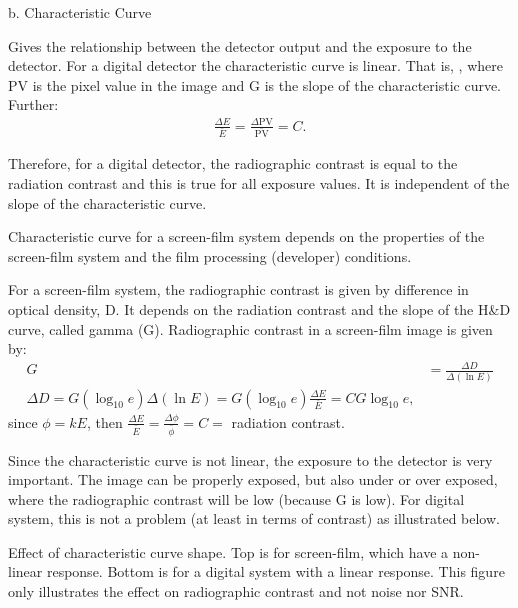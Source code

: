 \documentclass[mphy386-notes.tex]{subfiles}
\begin{document}
b. Characteristic Curve

Gives the relationship between the detector output and the exposure to the
detector. For a digital detector the characteristic curve is linear. That is,
, where PV is the pixel value in the image and G is the slope of the
characteristic curve. Further:
\begin{align}
  \frac{\Delta E}{\bar{E}} = \frac{\Delta \text{PV}}{\bar{\text{PV}}} = C.
\end{align}

Therefore, for a digital detector, the radiographic contrast is equal to the
radiation contrast and this is true for all exposure values. It is independent
of the slope of the characteristic curve.



Characteristic curve for a screen-film system depends on the properties of the
screen-film system and the film processing (developer) conditions.

For a screen-film system, the radiographic contrast is given by difference in
optical density, D. It depends on the radiation contrast and the slope of the
H\&D curve, called gamma (G). Radiographic contrast in a screen-film image is
given by:
\begin{align}
  G &= \frac{\Delta D}{\Delta(\ln E)}\\
  \Delta D = G(\log_{10}e)\Delta(\ln E) = G(\log_{10}e)\frac{\Delta E}{\bar{E}} = CG\log_{10}e, 
\end{align}
since $\phi = kE$, then $\frac{\Delta E}{\bar{E}} = \frac{\Delta \phi}{\bar{\phi}} = C =$ radiation contrast. 

Since the characteristic curve is not linear, the exposure to the detector is
very important. The image can be properly exposed, but also under or over
exposed, where the radiographic contrast will be low (because G is low).  For
digital system, this is not a problem (at least in terms of contrast) as
illustrated below.

Effect of characteristic curve shape.  Top is for screen-film, which have a
non-linear response. Bottom is for a digital system with a linear response.
This figure only illustrates the effect on radiographic contrast and not noise
nor SNR.
\end{document}
